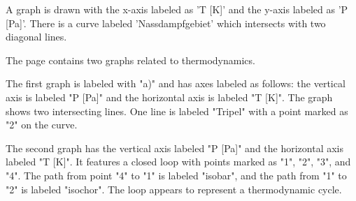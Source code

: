 A graph is drawn with the x-axis labeled as 'T [K]' and the y-axis labeled as 'P [Pa]'. There is a curve labeled 'Nassdampfgebiet' which intersects with two diagonal lines.

The page contains two graphs related to thermodynamics.

The first graph is labeled with "a)" and has axes labeled as follows: the vertical axis is labeled "P [Pa]" and the horizontal axis is labeled "T [K]". The graph shows two intersecting lines. One line is labeled "Tripel" with a point marked as "2" on the curve.

The second graph has the vertical axis labeled "P [Pa]" and the horizontal axis labeled "T [K]". It features a closed loop with points marked as "1", "2", "3", and "4". The path from point "4" to "1" is labeled "isobar", and the path from "1" to "2" is labeled "isochor". The loop appears to represent a thermodynamic cycle.